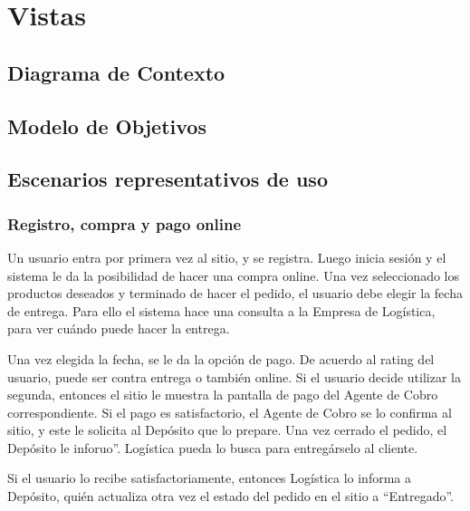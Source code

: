 \section{Vistas}
\fixme

  \newpage
  \subsection{Diagrama de Contexto}
  \fixme

  \newpage
  \subsection{Modelo de Objetivos}
  \fixme
  
  \newpage
  \subsection{Escenarios representativos de uso}
    
    \subsubsection{Registro, compra y pago online}

    Un usuario entra por primera vez al sitio, y se registra. Luego inicia sesión y el sistema le da la posibilidad de hacer una compra online. Una vez seleccionado los productos deseados y terminado de hacer el pedido, el usuario debe elegir la fecha de entrega. Para ello el sistema hace una consulta a la Empresa de Logística, para ver cuándo puede hacer la entrega. 
    
    Una vez elegida la fecha, se le da la opción de pago. De acuerdo al rating del usuario, puede ser contra entrega o también online. Si el usuario decide utilizar la segunda, entonces el sitio le muestra la pantalla de pago del Agente de Cobro correspondiente. Si el pago es satisfactorio, el Agente de Cobro se lo confirma al sitio, y este le solicita al Depósito que lo prepare. Una vez cerrado el pedido, el Depósito le inforuo”. Logística pueda lo busca para entregárselo al cliente. 
    
    Si el usuario lo recibe satisfactoriamente, entonces Logística lo informa a Depósito, quién actualiza otra vez el estado del pedido en el sitio a “Entregado”. 


    \fixme